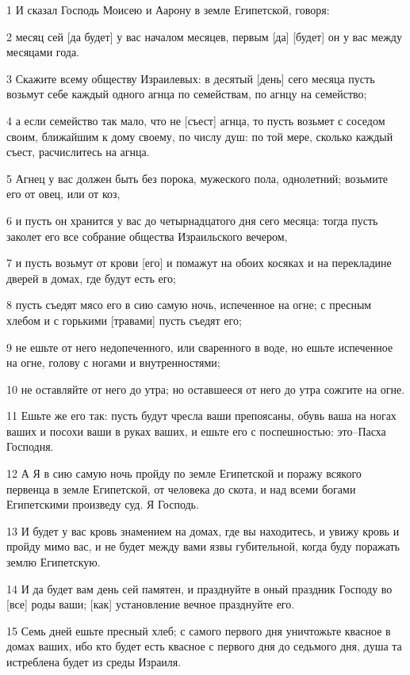 \par 1 И сказал Господь Моисею и Аарону в земле Египетской, говоря:
\par 2 месяц сей [да будет] у вас началом месяцев, первым [да] [будет] он у вас между месяцами года.
\par 3 Скажите всему обществу Израилевых: в десятый [день] сего месяца пусть возьмут себе каждый одного агнца по семействам, по агнцу на семейство;
\par 4 а если семейство так мало, что не [съест] агнца, то пусть возьмет с соседом своим, ближайшим к дому своему, по числу душ: по той мере, сколько каждый съест, расчислитесь на агнца.
\par 5 Агнец у вас должен быть без порока, мужеского пола, однолетний; возьмите его от овец, или от коз,
\par 6 и пусть он хранится у вас до четырнадцатого дня сего месяца: тогда пусть заколет его все собрание общества Израильского вечером,
\par 7 и пусть возьмут от крови [его] и помажут на обоих косяках и на перекладине дверей в домах, где будут есть его;
\par 8 пусть съедят мясо его в сию самую ночь, испеченное на огне; с пресным хлебом и с горькими [травами] пусть съедят его;
\par 9 не ешьте от него недопеченного, или сваренного в воде, но ешьте испеченное на огне, голову с ногами и внутренностями;
\par 10 не оставляйте от него до утра; но оставшееся от него до утра сожгите на огне.
\par 11 Ешьте же его так: пусть будут чресла ваши препоясаны, обувь ваша на ногах ваших и посохи ваши в руках ваших, и ешьте его с поспешностью: это--Пасха Господня.
\par 12 А Я в сию самую ночь пройду по земле Египетской и поражу всякого первенца в земле Египетской, от человека до скота, и над всеми богами Египетскими произведу суд. Я Господь.
\par 13 И будет у вас кровь знамением на домах, где вы находитесь, и увижу кровь и пройду мимо вас, и не будет между вами язвы губительной, когда буду поражать землю Египетскую.
\par 14 И да будет вам день сей памятен, и празднуйте в оный праздник Господу во [все] роды ваши; [как] установление вечное празднуйте его.
\par 15 Семь дней ешьте пресный хлеб; с самого первого дня уничтожьте квасное в домах ваших, ибо кто будет есть квасное с первого дня до седьмого дня, душа та истреблена будет из среды Израиля.
